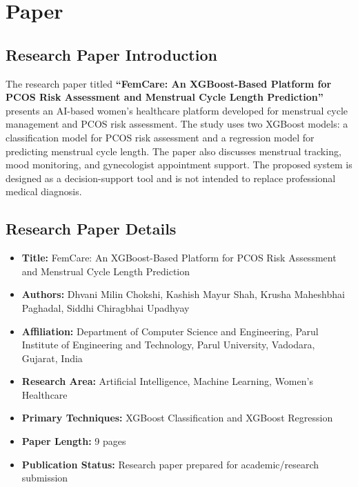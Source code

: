 \section{Paper}

\subsection*{Research Paper Introduction}

The research paper titled \textbf{``FemCare: An XGBoost-Based Platform for PCOS Risk Assessment and Menstrual Cycle Length Prediction''} presents an AI-based women's healthcare platform developed for menstrual cycle management and PCOS risk assessment. The study uses two XGBoost models: a classification model for PCOS risk assessment and a regression model for predicting menstrual cycle length. The paper also discusses menstrual tracking, mood monitoring, and gynecologist appointment support. The proposed system is designed as a decision-support tool and is not intended to replace professional medical diagnosis.

\subsection*{Research Paper Details}

\begin{itemize}
    \item \textbf{Title:} FemCare: An XGBoost-Based Platform for PCOS Risk Assessment and Menstrual Cycle Length Prediction
    
    \item \textbf{Authors:} Dhvani Milin Chokshi, Kashish Mayur Shah, Krusha Maheshbhai Paghadal, Siddhi Chiragbhai Upadhyay
    
    \item \textbf{Affiliation:} Department of Computer Science and Engineering, Parul Institute of Engineering and Technology, Parul University, Vadodara, Gujarat, India
    
    \item \textbf{Research Area:} Artificial Intelligence, Machine Learning, Women's Healthcare
    
    \item \textbf{Primary Techniques:} XGBoost Classification and XGBoost Regression
    
    \item \textbf{Paper Length:} 9 pages
    
    \item \textbf{Publication Status:} Research paper prepared for academic/research submission
\end{itemize}

